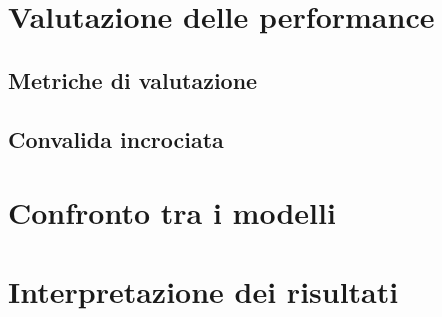 \label{chap:valutazioni}

%

\section{Valutazione delle performance}
\subsection{Metriche di valutazione}
\subsection{Convalida incrociata}
\section{Confronto tra i modelli}
\section{Interpretazione dei risultati}


